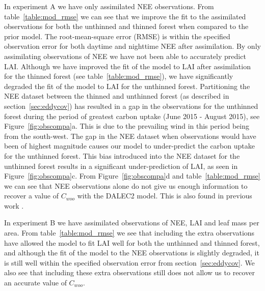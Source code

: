 \documentclass[draft,linenumbers]{agujournal}
\begin{document}
In experiment A we have only assimilated NEE observations. From table~\ref{table:mod_rmse} we can see that we improve the fit to the assimilated observations for both the unthinned and thinned forest when compared to the prior model. The root-mean-square error (RMSE) is within the specified observation error for both daytime and nighttime NEE after assimilation. By only assimilating observations of NEE we have not been able to accurately predict LAI. Although we have improved the fit of the model to LAI after assimilation for the thinned forest (see table~\ref{table:mod_rmse}), we have significantly degraded the fit of the model to LAI for the unthinned forest. Partitioning the NEE dataset between the thinned and unthinned forest (as described in section~\ref{sec:eddycov}) has resulted in a gap in the observations for the unthinned forest during the period of greatest carbon uptake (June 2015 - August 2015), see Figure~\ref{fig:obscompa}a. This is due to the prevailing wind in this period being from the south-west. The gap in the NEE dataset when observations would have been of highest magnitude causes our model to under-predict the carbon uptake for the unthinned forest. This bias introduced into the NEE dataset for the unthinned forest results in a {\color{blue}significant} under-prediction of LAI, as seen in Figure~\ref{fig:obscompa}c. From Figure~\ref{fig:obscompa}d and table~\ref{table:mod_rmse} we can see that NEE observations alone do not give us enough information to recover a value of \(C_{woo}\) with the DALEC2 model. This is also found in previous work \citep{fox2009reflex}.

In experiment B we have assimilated observations of NEE, LAI and leaf mass per area. From table~\ref{table:mod_rmse} we see that including the extra observations have allowed the model to fit LAI well for both the unthinned and thinned forest, and although the fit of the model to the NEE observations is slightly degraded, it is still well within the specified observation error from section~\ref{sec:eddycov}. We also see that including these extra observations still does not allow us to recover an accurate value of \(C_{woo}\).      
\end{document}
